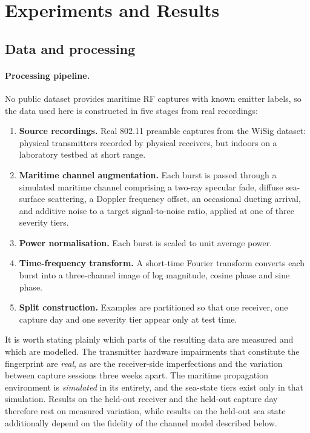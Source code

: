 \documentclass{article}
\begin{document}
\section{Experiments and Results}
\label{sec:experiments}

\subsection{Data and processing}

\paragraph{Processing pipeline.}
No public dataset provides maritime RF captures with known emitter labels, so
the data used here is constructed in five stages from real recordings:

\begin{enumerate}\itemsep2pt
  \item \textbf{Source recordings.} Real 802.11 preamble captures from the WiSig
        dataset: physical transmitters recorded by physical receivers, but
        indoors on a laboratory testbed at short range.
  \item \textbf{Maritime channel augmentation.} Each burst is passed through a
        simulated maritime channel comprising a two-ray specular fade, diffuse
        sea-surface scattering, a Doppler frequency offset, an occasional
        ducting arrival, and additive noise to a target signal-to-noise ratio,
        applied at one of three severity tiers.
  \item \textbf{Power normalisation.} Each burst is scaled to unit average
        power.
  \item \textbf{Time-frequency transform.} A short-time Fourier transform
        converts each burst into a three-channel image of log magnitude, cosine
        phase and sine phase.
  \item \textbf{Split construction.} Examples are partitioned so that one
        receiver, one capture day and one severity tier appear only at test
        time.
\end{enumerate}

It is worth stating plainly which parts of the resulting data are measured and
which are modelled. The transmitter hardware impairments that constitute the
fingerprint are \emph{real}, as are the receiver-side imperfections and the
variation between capture sessions three weeks apart. The maritime propagation
environment is \emph{simulated} in its entirety, and the sea-state tiers exist
only in that simulation. Results on the held-out receiver and the held-out
capture day therefore rest on measured variation, while results on the held-out
sea state additionally depend on the fidelity of the channel model described
below.
\end{document}
